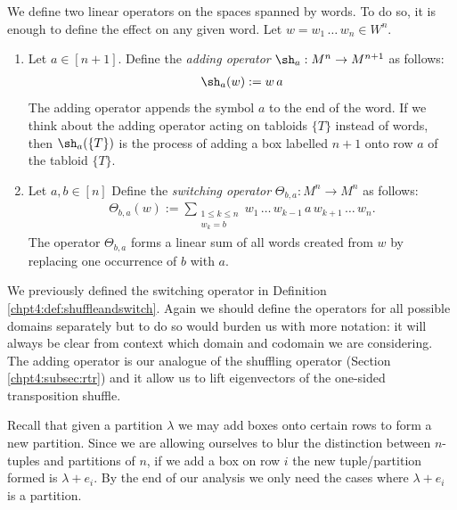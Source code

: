 \documentclass[11pt]{report}
\begin{document}
\begin{defn}
	\label{chpt5:def:linoperators}
	We define two linear operators on the spaces spanned by words. To do 
	so, it 	is enough to define the effect on any given word. Let $w = 
	w_{1} \, \ldots \, w_{n} \in W^{n}$.
	\begin{enumerate}
		\item Let $a \in [n+1]$. Define the \emph{adding 
			operator} $\sh_{a}:M^{n} \rightarrow M^{n+1}$ as follows:
		\begin{eqnarray}
		\sh_{a}(w) := w \, a \label{chpt5:eqn:addingoperator}
		\end{eqnarray}
		The adding operator appends the symbol $a$ to the end of the word. 	
		If we think about the adding operator acting on tabloids $\{T\}$ 
		instead of words, then $\sh_{a}(\{T\})$ is the process of adding a box labelled $n+1$ onto row $a$ of the tabloid $\{T\}$. 
		
		\item Let $a,b\in[n]$ Define the \emph{switching operator} 
		$\Theta_{b,a}:M^{n}\rightarrow 	M^{n}$ as follows:
		\begin{eqnarray}
		\Theta_{b,a}(w) := \sum_{\substack{1 \leq k \leq n \\ w_{k} = b}} 
		w_{1}\, \ldots \, w_{k-1} \, a \, w_{k+1}\, \ldots 
		\, w_{n}. \label{chpt5:eqn:switchingoperator}
		\end{eqnarray}
		The operator $\Theta_{b,a}$ forms a linear sum of all words created 
		from $w$ by replacing one occurrence of $b$ with $a$.
	\end{enumerate}
\end{defn}












We previously defined the switching operator in Definition \ref{chpt4:def:shuffleandswitch}. Again we should define the operators for all possible domains separately but to do so would burden us with more notation: it will always be clear from context which domain and codomain we are considering.
The adding operator is our analogue of the shuffling operator (Section \ref{chpt4:subsec:rtr}) and it allow us to lift eigenvectors of the one-sided transposition shuffle. 

Recall that given a partition $\lambda$ we may add boxes onto certain rows to form a new partition.  Since we are allowing ourselves to blur the distinction between $n$-tuples and partitions of $n$, 
if we add a box on row $i$ the new tuple/partition formed is 
$\lambda+e_{i}$. By the end of our analysis we only need the cases 
where $\lambda+e_{i}$ is a partition. 
\end{document}
